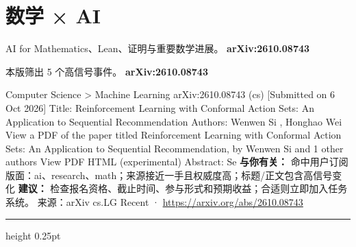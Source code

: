 \documentclass[10.5pt]{ctexart}
\begin{document}
\section*{数学 × AI}
{\color{ormuted} AI for Mathematics、Lean、证明与重要数学进展。}
\vspace{2mm}
{\LARGE\bfseries arXiv:2610.08743}\par
\vspace{1mm}
{\color{ormuted} 本版筛出 5 个高信号事件。}
\vspace{3mm}
{\Large\bfseries arXiv:2610.08743}\par
Computer Science > Machine Learning arXiv:2610.08743 (cs) [Submitted on 6 Oct 2026] Title: Reinforcement Learning with Conformal Action Sets: An Application to Sequential Recommendation Authors: Wenwen Si , Honghao Wei View a PDF of the paper titled Reinforcement Learning with Conformal Action Sets: An Application to Sequential Recommendation, by Wenwen Si and 1 other authors View PDF HTML (experimental) Abstract: Se
\textbf{与你有关：} 命中用户订阅版面：ai、research、math；来源接近一手且权威度高；标题/正文包含高信号变化
\textbf{建议：} 检查报名资格、截止时间、参与形式和预期收益；合适则立即加入任务系统。
{\footnotesize\color{ormuted} 来源：arXiv cs.LG Recent · \url{https://arxiv.org/abs/2610.08743}}
\vspace{4mm}
\hrule height 0.25pt
\vspace{3mm}
\end{document}
